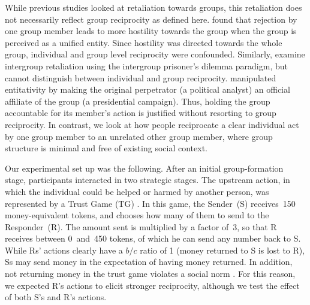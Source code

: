 \documentclass[12pt,a4paper]{article}\usepackage[]{graphicx}\usepackage[]{color}
\begin{document}

While previous studies looked at retaliation towards groups, this retaliation does not necessarily reflect group reciprocity as defined here. \citet{gaertner2008whenrejection} found that rejection by one group member leads to more hostility towards the group when the group is perceived as a unified entity. Since hostility was directed towards the whole group, individual and group level reciprocity were confounded. Similarly, \citet{bohm2016makes} examine intergroup retaliation using the intergroup prisoner's
dilemma paradigm, but cannot distinguish between individual and group reciprocity.
\citet{stenstrom2008theroles} manipulated entitativity by making the original perpetrator (a political analyst) an official affiliate of the group (a presidential campaign). Thus, holding the group accountable for its member's action is justified without resorting to group reciprocity. In contrast, we look at how people reciprocate a clear individual act by one group member to an unrelated other group member, where group structure is minimal and free of existing social context. 


Our experimental set up was the following. After an initial group-formation stage, participants interacted in two strategic stages. The upstream action, in which the individual could be helped or harmed by another person, was represented by a Trust Game (TG) \citep{berg1995trust}.  In this game, the Sender~(S) receives~150 money-equivalent tokens, and chooses how many of them to send to the Responder~(R). The amount sent is multiplied by a factor of~3, so that R receives between 0~and~450 tokens, of which he can send any number back to S.  While
Rs' actions clearly have a $b/c$ ratio of 1 (money returned to S is lost to R), Ss may send money in the expectation of having
money returned. In addition, not returning money in the trust game violates a social norm \citep{kimbrough2015norms}. For
this reason, we expected R's actions to elicit stronger reciprocity, although we test the effect of both S's and R's actions.


\end{document}

